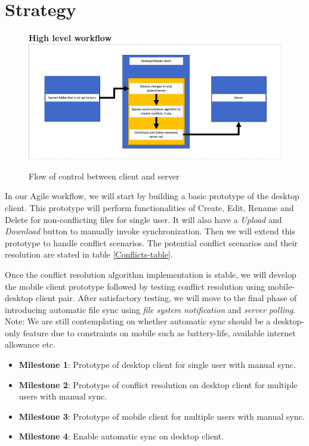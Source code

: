 

\section{Strategy}
\begin{figure}[H]
	\centering
	\textbf{High level workflow}
	\includegraphics[width=\linewidth]{images/1.png}
	\caption{Flow of control between client and server}
\end{figure}\par
In our Agile workflow, we will start by building a basic prototype of the desktop client. This prototype will perform functionalities of Create, Edit, Rename and Delete for non-conflicting files for single user. It will also have a \emph{Upload} and \emph{Download} button to manually invoke synchronization. Then we will extend this prototype to handle conflict scenarios. The potential conflict scenarios and their resolution are stated in table \ref{Conflicts-table}.\newline

Once the conflict resolution algorithm implementation is stable, we will develop the mobile client prototype followed by testing conflict resolution using mobile-desktop client pair. After satisfactory testing, we will move to the final phase of introducing automatic file sync using \emph{file system notification} and \emph{server polling}. Note: We are still contemplating on whether automatic sync should be a desktop-only feature due to constraints on mobile such as battery-life, available internet allowance etc.

\begin{itemize}
\item \textbf{Milestone 1}: Prototype of desktop client for single user with manual sync.
\item \textbf{Milestone 2}: Prototype of conflict resolution on desktop client for multiple users with manual sync.
\item \textbf{Milestone 3}: Prototype of mobile client for multiple users with manual sync.
\item \textbf{Milestone 4}: Enable automatic sync on desktop client.
\end{itemize}
